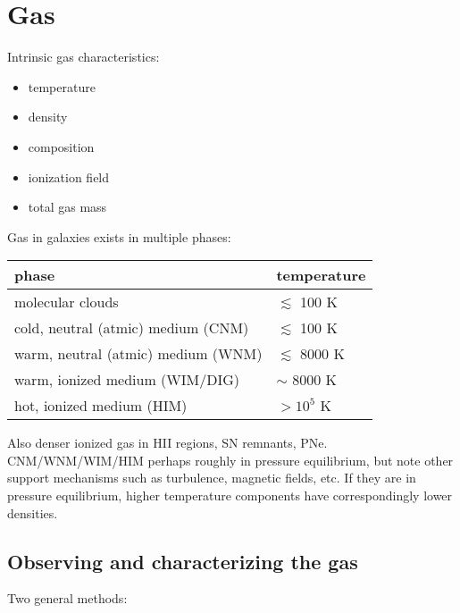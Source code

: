 \documentclass{article}
\begin{document}
\section{Gas}
Intrinsic gas characteristics:
\begin{itemize}
    \item temperature
    \item density
    \item composition
    \item ionization field
    \item total gas mass
\end{itemize}
Gas in galaxies exists in multiple phases:
\begin{center}
\begin{tabular}{l l}
    phase & temperature\\
    \hline
    molecular clouds & $\lesssim$ 100 K\\
    cold, neutral (atmic) medium (CNM) & $\lesssim$ 100 K\\
    warm, neutral (atmic) medium (WNM) & $\lesssim$ 8000 K\\
    warm, ionized medium (WIM/DIG) & $\sim$ 8000 K\\
    hot, ionized medium (HIM) & $> 10^{5}$ K\\
\end{tabular}
\end{center}
Also denser ionized gas in HII regions, SN remnants, PNe.
CNM/WNM/WIM/HIM perhaps roughly in pressure equilibrium, but note
other support mechanisms such as turbulence, magnetic fields, etc.
If they are in pressure equilibrium, higher temperature components
have correspondingly lower densities.

\subsection{Observing and characterizing the gas}
Two general methods:
\end{document}
